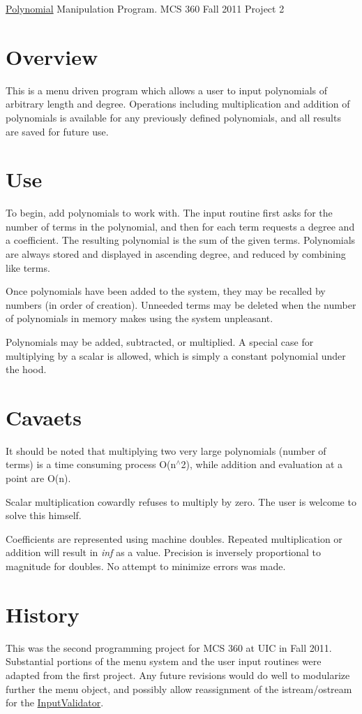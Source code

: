 \hyperlink{classPolynomial}{Polynomial} Manipulation Program. MCS 360 Fall 2011 Project 2\hypertarget{index_Overview}{}\section{Overview}\label{index_Overview}
This is a menu driven program which allows a user to input polynomials of arbitrary length and degree. Operations including multiplication and addition of polynomials is available for any previously defined polynomials, and all results are saved for future use.\hypertarget{index_Use}{}\section{Use}\label{index_Use}
To begin, add polynomials to work with. The input routine first asks for the number of terms in the polynomial, and then for each term requests a degree and a coefficient. The resulting polynomial is the sum of the given terms. Polynomials are always stored and displayed in ascending degree, and reduced by combining like terms.

Once polynomials have been added to the system, they may be recalled by numbers (in order of creation). Unneeded terms may be deleted when the number of polynomials in memory makes using the system unpleasant.

Polynomials may be added, subtracted, or multiplied. A special case for multiplying by a scalar is allowed, which is simply a constant polynomial under the hood.\hypertarget{index_Cavaets}{}\section{Cavaets}\label{index_Cavaets}
It should be noted that multiplying two very large polynomials (number of terms) is a time consuming process O(n$^\wedge$2), while addition and evaluation at a point are O(n).

Scalar multiplication cowardly refuses to multiply by zero. The user is welcome to solve this himself.

Coefficients are represented using machine doubles. Repeated multiplication or addition will result in {\em inf\/} as a value. Precision is inversely proportional to magnitude for doubles. No attempt to minimize errors was made.\hypertarget{index_History}{}\section{History}\label{index_History}
This was the second programming project for MCS 360 at UIC in Fall 2011. Substantial portions of the menu system and the user input routines were adapted from the first project. Any future revisions would do well to modularize further the menu object, and possibly allow reassignment of the istream/ostream for the \hyperlink{classInputValidator}{InputValidator}. 